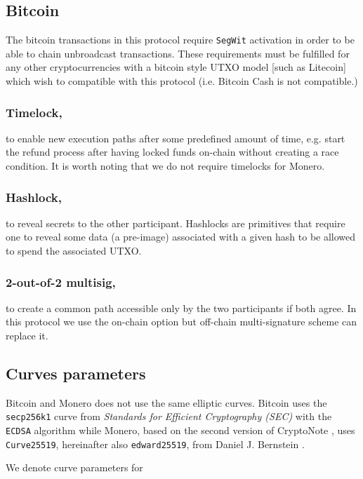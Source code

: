 \documentclass{llncs}
\begin{document}
\subsection{Bitcoin}
\label{bitcoinPrerequisites}
The bitcoin transactions in this protocol require \texttt{SegWit} activation in order to be able to chain unbroadcast transactions. These requirements must be fulfilled for any other cryptocurrencies with a bitcoin style UTXO model [such as Litecoin] which wish to compatible with this protocol (i.e. Bitcoin Cash is not compatible.)

\subsubsection{Timelock,}
to enable new execution paths after some predefined amount of time, e.g. start the refund process after having locked funds on-chain without creating a race condition. It is worth noting that we do not require timelocks for Monero.

\subsubsection{Hashlock,}
to reveal secrets to the other participant. Hashlocks are primitives that require one to reveal some data (a pre-image) associated with a given hash to be allowed to spend the associated UTXO.

\subsubsection{2-out-of-2 multisig,}
to create a common path accessible only by the two participants if both agree. In this protocol we use the on-chain option  but off-chain multi-signature scheme can replace it.

\subsection{Curves parameters}
\label{curveParams}
Bitcoin and Monero does not use the same elliptic curves. Bitcoin uses the \texttt{secp256k1} curve from \textit{Standards for Efficient Cryptography (SEC)} with the \texttt{ECDSA} algorithm while Monero, based on the second version of CryptoNote \cite{van2013cryptonote}, uses \texttt{Curve25519}, hereinafter also \texttt{edward25519}, from Daniel J. Bernstein \cite{CerRes10}.

We denote curve parameters for
\end{document}
